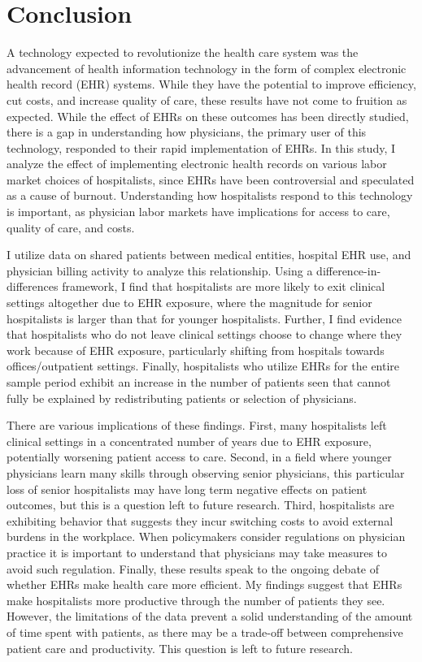 \documentclass[12pt]{article}
\begin{document}
\section{Conclusion}

A technology expected to revolutionize the health care system was the advancement of health information technology in the form of complex electronic health record (EHR) systems. While they have the potential to improve efficiency, cut costs, and increase quality of care, these results have not come to fruition as expected. While the effect of EHRs on these outcomes has been directly studied, there is a gap in understanding how physicians, the primary user of this technology, responded to their rapid implementation of EHRs. In this study, I analyze the effect of implementing electronic health records on various labor market choices of hospitalists, since EHRs have been controversial and speculated as a cause of burnout. Understanding how hospitalists respond to this technology is important, as physician labor markets have implications for access to care, quality of care, and costs. 

I utilize data on shared patients between medical entities, hospital EHR use, and physician billing activity to analyze this relationship. Using a difference-in-differences framework, I find that hospitalists are more likely to exit clinical settings altogether due to EHR exposure, where the magnitude for senior hospitalists is larger than that for younger hospitalists. Further, I find evidence that hospitalists who do not leave clinical settings choose to change where they work because of EHR exposure, particularly shifting from hospitals towards offices/outpatient settings. Finally, hospitalists who utilize EHRs for the entire sample period exhibit an increase in the number of patients seen that cannot fully be explained by redistributing patients or selection of physicians. 

There are various implications of these findings. First, many hospitalists left clinical settings in a concentrated number of years due to EHR exposure, potentially worsening patient access to care. Second, in a field where younger physicians learn many skills through observing senior physicians, this particular loss of senior hospitalists may have long term negative effects on patient outcomes, but this is a question left to future research. Third, hospitalists are exhibiting behavior that suggests they incur switching costs to avoid external burdens in the workplace. When policymakers consider regulations on physician practice it is important to understand that physicians may take measures to avoid such regulation. Finally, these results speak to the ongoing debate of whether EHRs make health care more efficient. My findings suggest that EHRs make hospitalists more productive through the number of patients they see. However, the limitations of the data prevent a solid understanding of the amount of time spent with patients, as there may be a trade-off between comprehensive patient care and productivity. This question is left to future research.  
 
\end{document}
